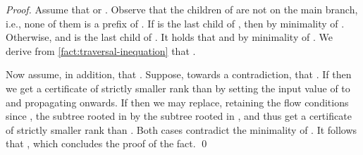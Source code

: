 \FactDescentOutsideMB*
\begin{proof}
  Assume that  or .
  Observe that the children of  are not on the main branch,
  i.e.,
  none of them is a prefix of .
  If  is the last child of ,
  then  by minimality of .
  Otherwise,
   and  is the last child of .
  It holds that  and 
  by minimality of .
  We derive from \cref{fact:traversal-inequation} that
  .

  Now assume, in addition, that .
  Suppose, towards a contradiction, that .
  If  then we get a certificate 
  of strictly smaller rank than  by setting the input value
  of  to  and propagating onwards.
  If  then we may replace,
  retaining the flow conditions since ,
  the subtree rooted in  by the subtree rooted in ,
  and thus get a certificate
  of strictly smaller rank than .
  Both cases contradict the minimality of .
  It follows that ,
  which concludes the proof of the fact.
  \qed
\end{proof}

